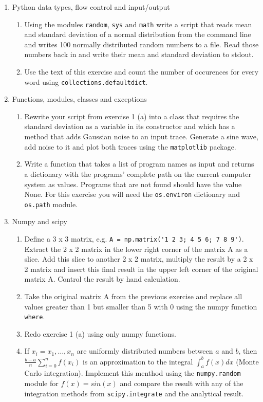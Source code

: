\documentclass{article}
\begin{document}
\begin{enumerate}

  \item Python data types, flow control and input/output
  \begin{enumerate}
    \item Using the modules \verb#random#, \verb#sys# and \verb#math# write a
    script that reads mean and standard deviation of a normal distribution from 
    the command line and writes 100
	normally distributed random numbers to a file.
	Read those numbers back in and write their mean
	and standard deviation to stdout.
	\item Use the text of this exercise and count the number of occurences for
	every word using \verb#collections.defaultdict#. 
  \end{enumerate}

  \item Functions, modules, classes and exceptions
  \begin{enumerate}
    \item Rewrite your script from exercise 1 (a) into a class that requires
	the standard deviation as a variable in its constructor
	and which has a method that adds Gaussian noise to an
	input trace. Generate a sine wave, add noise to it and plot
	both traces using the \verb#matplotlib# package.
	\item Write a function that takes a list of program 
	names as input and returns a dictionary with 
	the programs' complete path on the current computer
	system as values. Programs that are not found should
	have the value None.
	For this exercise you will need the \verb#os.environ# dictionary and
	\verb#os.path# module.
    \end{enumerate}

    \item Numpy and scipy
    \begin{enumerate}
      \item Define a 3 x 3 matrix, e.g. 
      \verb#A = np.matrix('1 2 3; 4 5 6; 7 8 9')#. Extract the 2 x 2 matrix in
      the lower right corner of the matrix A as a slice. Add this slice to another 2 x 2 matrix, multiply the result by a 2 x 2 matrix and insert this final result in the upper left corner of the original matrix A.
      Control the result by hand calculation. 
      \item Take the original matrix A from the previous exercise and
       replace all values greater than 1 but smaller than 5 with 0 using the
       numpy function \verb#where#.
      \item Redo exercise 1 (a) using only numpy functions.
      \item If $x_i = x_1, \ldots, x_n$ are uniformly distributed numbers
      between $a$ and $b$, then $\frac{b-a}{n}\sum_{i=0}^n f(x_i)$ is an
      approximation to the integral $\int_a^b f(x)dx$ (Monte Carlo integration).
      Implement this menthod using the \verb#numpy.random# module for $f(x) =
      sin(x)$ and compare the result with any of the integration methods from
      \verb#scipy.integrate# and the analytical result.
    \end{enumerate}
    

\end{enumerate}
\end{document}
